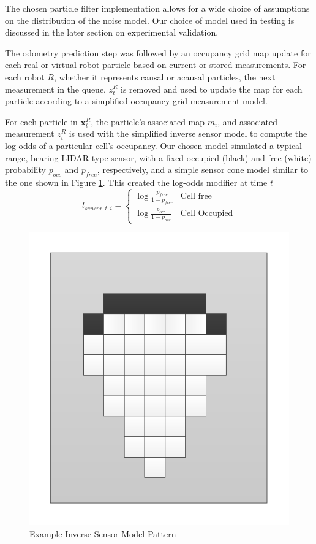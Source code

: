 The chosen particle filter implementation allows for a wide choice of assumptions on the distribution of the noise model. Our choice of model used in testing is discussed in the later section on experimental validation.

The odometry prediction step was followed by an occupancy grid map update for each real or virtual robot particle based on current or stored measurements. For each robot $R$, whether it represents causal or acausal particles, the next measurement in the queue, $z_t^R$ is removed and used to update the map for each particle according to a simplified occupancy grid measurement model.

For each particle in $\textbf{x}_t^R$,  the particle's associated map $m_i$, and associated measurement $z_t^R$ is used with the simplified inverse sensor model to compute the log-odds of a particular cell’s occupancy. Our chosen model simulated a typical range, bearing LIDAR type sensor, with a fixed occupied (black) and free (white) probability $p_{occ}$ and $p_{free}$, respectively, and a simple sensor cone model similar to the one shown in Figure \ref{fig:invsensor}. This created the log-odds modifier at time $t$
$$l_{sensor,t,i}=
\begin{cases}
\log\frac{p_{free}}{1-p_{free}} & \text{Cell free}\\ 
\log\frac{p_{occ}}{1-p_{occ}} & \text{Cell Occupied}
\end{cases}$$

\begin{figure}[ht]
\centering
\includegraphics[width=\columnwidth]{../FinalFigures/invsensormodel.pdf}
\caption{Example Inverse Sensor Model Pattern}
\label{fig:invsensor}
\end{figure}

